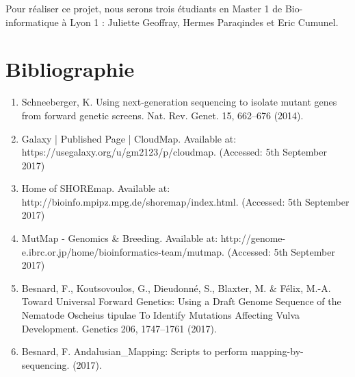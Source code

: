 \documentclass[12pt]{article}
\begin{document}
Pour réaliser ce projet, nous serons trois étudiants en Master 1 de Bio-informatique à Lyon 1 : Juliette Geoffray, Hermes Paraqindes et Eric Cumunel.

\section{Bibliographie}
\begin{enumerate}
\item Schneeberger, K. Using next-generation sequencing to isolate mutant genes from forward genetic screens. Nat. Rev.
Genet. 15, 662–676 (2014).
\item Galaxy | Published Page | CloudMap. Available at: https://usegalaxy.org/u/gm2123/p/cloudmap. (Accessed: 5th
September 2017)
\item Home of SHOREmap. Available at: http://bioinfo.mpipz.mpg.de/shoremap/index.html. (Accessed: 5th September
2017)
\item MutMap - Genomics \& Breeding. Available at: http://genome-e.ibrc.or.jp/home/bioinformatics-team/mutmap.
(Accessed: 5th September 2017)
\item Besnard, F., Koutsovoulos, G., Dieudonné, S., Blaxter, M. \& Félix, M.-A. Toward Universal Forward Genetics:
Using a Draft Genome Sequence of the Nematode Oscheius tipulae To Identify Mutations Affecting Vulva
Development. Genetics 206, 1747–1761 (2017).
\item Besnard, F. Andalusian\_Mapping: Scripts to perform mapping-by-sequencing. (2017).
\end{enumerate}
\end{document}
